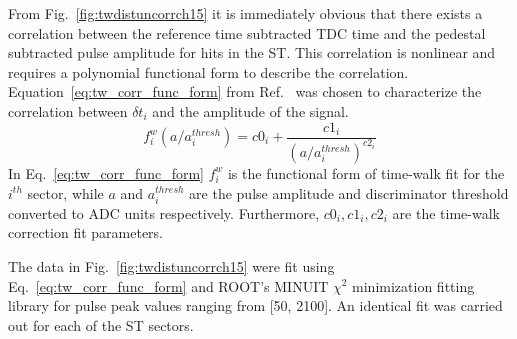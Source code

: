 From Fig.~\ref{fig:twdistuncorrch15} it is immediately obvious that there exists a correlation between the reference time subtracted TDC time and the pedestal subtracted pulse amplitude for hits in the ST.  This correlation is nonlinear and requires a polynomial functional form to describe the correlation. Equation~\ref{eq:tw_corr_func_form} from Ref.~\cite{esmith_bcal} was chosen to characterize the correlation between $\delta t_{i}$ and the amplitude of the signal. 
	\begin{equation} \label{eq:tw_corr_func_form}
		f^{w}_{i}\left(a/a^{thresh}_{i}\right) = c0_{i} + \frac{c1_{i}}{(a/a^{thresh}_{i})^{c2_{i}}}
	\end{equation}
In Eq.~\ref{eq:tw_corr_func_form} $f^{w}_{i}$ is the functional form of time-walk fit for the $i^{th}$ sector, while $a$ and $a^{thresh}_{i}$ are the pulse amplitude and discriminator threshold converted to ADC units respectively.  Furthermore, $c0_{i}, c1_{i}, c2_{i}$ are the time-walk correction fit parameters.

The data in Fig.~\ref{fig:twdistuncorrch15} were fit using Eq.~\ref{eq:tw_corr_func_form} and ROOT's MINUIT $\chi^{2}$ minimization fitting library \cite{root_minuit} for pulse peak values ranging from [50, 2100].  An identical fit was carried out for each of the ST sectors.

